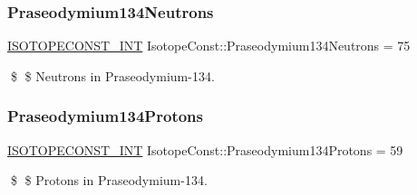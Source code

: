 \subsubsection{\texorpdfstring{Praseodymium134\+Neutrons}{Praseodymium134Neutrons}}
{\footnotesize\ttfamily \mbox{\hyperlink{group___isotope_const-_macros_ga5f18360b3e99483a35c32d789e62621c}{I\+S\+O\+T\+O\+P\+E\+C\+O\+N\+S\+T\+\_\+\+I\+NT}} Isotope\+Const\+::\+Praseodymium134\+Neutrons = 75}

\$ \$ Neutrons in Praseodymium-\/134. \mbox{\label{group___isotope_const-_praseodymium-_pr134_ga85603a255a42d75020dbeb1a2229ee1a}} 
\subsubsection{\texorpdfstring{Praseodymium134\+Protons}{Praseodymium134Protons}}
{\footnotesize\ttfamily \mbox{\hyperlink{group___isotope_const-_macros_ga5f18360b3e99483a35c32d789e62621c}{I\+S\+O\+T\+O\+P\+E\+C\+O\+N\+S\+T\+\_\+\+I\+NT}} Isotope\+Const\+::\+Praseodymium134\+Protons = 59}

\$ \$ Protons in Praseodymium-\/134. 